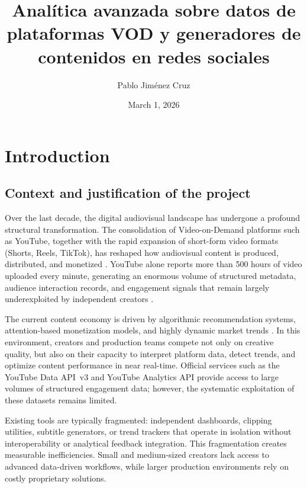 \documentclass[ENG]{TFUOC}
\title{Analítica avanzada sobre datos de plataformas VOD y generadores de contenidos en redes sociales}
\author{Pablo Jiménez Cruz}
\date{March 1, 2026}
\begin{document}
\estructura

\tableofcontents

\listoffigures

\listoftables


\chapter{Introduction}

\section{Context and justification of the project}

Over the last decade, the digital audiovisual landscape has undergone a profound structural transformation. The consolidation of Video-on-Demand platforms such as YouTube, together with the rapid expansion of short-form video formats (Shorts, Reels, TikTok), has reshaped how audiovisual content is produced, distributed, and monetized \cite{vod_bigdata}. YouTube alone reports more than 500 hours of video uploaded every minute, generating an enormous volume of structured metadata, audience interaction records, and engagement signals that remain largely underexploited by independent creators \cite{recommender_systems_streaming}.

The current content economy is driven by algorithmic recommendation systems, attention-based monetization models, and highly dynamic market trends \cite{recommender_systems_streaming}. In this environment, creators and production teams compete not only on creative quality, but also on their capacity to interpret platform data, detect trends, and optimize content performance in near real-time. Official services such as the YouTube Data API~v3 and YouTube Analytics API provide access to large volumes of structured engagement data; however, the systematic exploitation of these datasets remains limited.

Existing tools are typically fragmented: independent dashboards, clipping utilities, subtitle generators, or trend trackers that operate in isolation without interoperability or analytical feedback integration. This fragmentation creates measurable inefficiencies. Small and medium-sized creators lack access to advanced data-driven workflows, while larger production environments rely on costly proprietary solutions.
\end{document}
